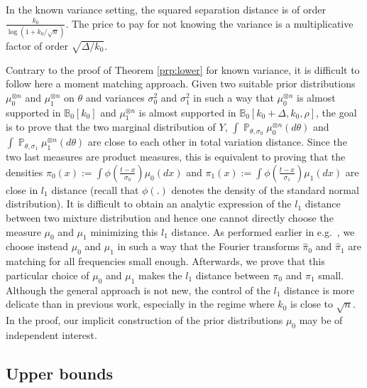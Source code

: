 \documentclass[twoside,11pt]{article}
\def\bbB{\mathbb{B}}
\renewcommand{\P}{\operatorname{\mathbb{P}}}
\newcommand{\<}{\langle}
\renewcommand{\>}{\rangle}
\begin{document}
In  the known variance setting, the squared separation distance is of order $\frac{k_0}{\log(1 + k_0/\sqrt{n})}$. The price to pay for not knowing the variance is a multiplicative factor of order $\sqrt{\Delta/k_0}$. 



Contrary to the proof of Theorem \ref{prp:lower} for known variance, it is difficult to follow here a moment matching approach. Given two suitable  prior distributions $\mu_0^{\otimes n}$ and $\mu_1^{\otimes n}$ on $\theta$ and variances $\sigma_0^2$ and $\sigma_1^2$ in such a way that $\mu_0^{\otimes n}$ is almost supported in $\bbB_0[k_0]$ and $\mu_1^{\otimes n}$ is almost supported in $\bbB_0[k_0+\Delta,k_0,\rho]$, the goal is to prove that the two marginal distribution of $Y$, $\int \P_{\theta,\sigma_0}\mu^{\otimes n}_0(d\theta)$ and $\int \P_{\theta,\sigma_1}\mu^{\otimes n}_1(d\theta)$ are close to each other in total variation distance. Since the two last measures are product measures, this is equivalent to proving that the densities  $\pi_0(x):= \int \phi(\frac{t-x}{\sigma_0})\mu_0(dx)$ and $\pi_1(x):= \int \phi(\frac{t-x}{\sigma_1})\mu_1(dx)$ are close in $l_1$ distance
(recall that $\phi(.)$ denotes the density of the  standard normal distribution). It is difficult to obtain an analytic expression of the $l_1$ distance between two mixture distribution and hence one cannot directly choose 
the measure $\mu_0$ and $\mu_1$ minimizing this $l_1$ distance. As performed earlier in e.g.\  \cite{cailow2011,kalai2012disentangling}, we choose instead  $\mu_0$ and $\mu_1$ in such a way that the Fourier transforms $\widehat{\pi}_0$ and $\widehat{\pi}_1$ are matching for all frequencies small enough. Afterwards, we prove that this particular choice of $\mu_0$ and $\mu_1$ makes the $l_1$ distance between $\pi_0$ and $\pi_1$ small. 
Although the general approach is not new, the control of the $l_1$ distance is more delicate than in previous work, especially in the regime where $k_0$ is close to $\sqrt{n}$. In the proof, our implicit construction of the prior distributions $\mu_0$ may be of independent interest.







\subsection{Upper bounds}\label{sec:ubuv}
\end{document}
